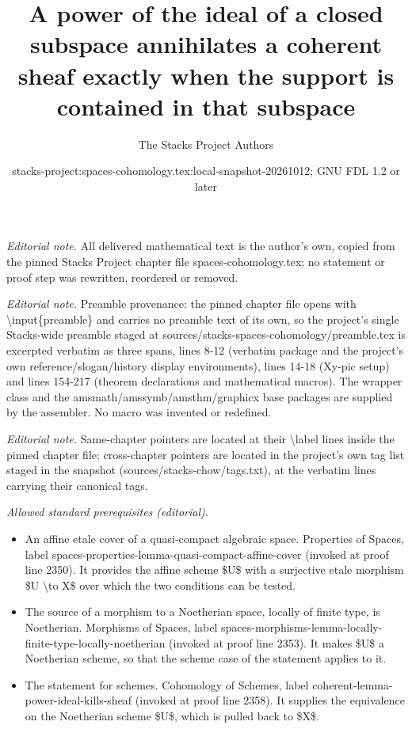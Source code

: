 \documentclass[10pt,a4paper]{amsart}
\title{A power of the ideal of a closed subspace annihilates a coherent sheaf exactly when the support is contained in that subspace}
\author{The Stacks Project Authors}
\date{stacks-project:spaces-cohomology.tex:local-snapshot-20261012; GNU FDL 1.2 or later}
\theoremstyle{plain}
\theoremstyle{definition}
\theoremstyle{remark}
\numberwithin{equation}{subsection}
\begin{document}
\maketitle
\noindent\textit{Editorial note.} All delivered mathematical text is the author's own, copied from the pinned Stacks Project chapter file spaces-cohomology.tex; no statement or proof step was rewritten, reordered or removed.\par\medskip
\noindent\textit{Editorial note.} Preamble provenance: the pinned chapter file opens with \textbackslash{}input\{preamble\} and carries no preamble text of its own, so the project's single Stacks-wide preamble staged at sources/stacks-spaces-cohomology/preamble.tex is excerpted verbatim as three spans, lines 8-12 (verbatim package and the project's own reference/slogan/history display environments), lines 14-18 (Xy-pic setup) and lines 154-217 (theorem declarations and mathematical macros). The wrapper class and the amsmath/amssymb/amsthm/graphicx base packages are supplied by the assembler. No macro was invented or redefined.\par\medskip
\noindent\textit{Editorial note.} Same-chapter pointers are located at their \textbackslash{}label lines inside the pinned chapter file; cross-chapter pointers are located in the project's own tag list staged in the snapshot (sources/stacks-chow/tags.txt), at the verbatim lines carrying their canonical tags.\par\medskip
\noindent\textit{Allowed standard prerequisites (editorial).}\begin{itemize}
\item An affine etale cover of a quasi-compact algebraic space. Properties of Spaces, label spaces-properties-lemma-quasi-compact-affine-cover (invoked at proof line 2350). It provides the affine scheme \$U\$ with a surjective etale morphism \$U \textbackslash{}to X\$ over which the two conditions can be tested.
\item The source of a morphism to a Noetherian space, locally of finite type, is Noetherian. Morphisms of Spaces, label spaces-morphisms-lemma-locally-finite-type-locally-noetherian (invoked at proof line 2353). It makes \$U\$ a Noetherian scheme, so that the scheme case of the statement applies to it.
\item The statement for schemes. Cohomology of Schemes, label coherent-lemma-power-ideal-kills-sheaf (invoked at proof line 2358). It supplies the equivalence on the Noetherian scheme \$U\$, which is pulled back to \$X\$.
\end{itemize}\medskip
\end{document}
